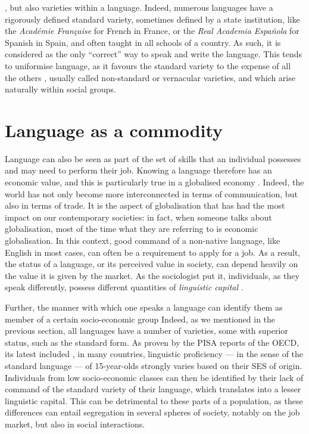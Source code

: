 \documentclass[../thesis.tex]{subfiles}
\begin{document}
\cite{GalMultilingualism2006,RomaineBilingualMultilingual2012,FasoldSociolinguisticsSociety1984},
but also varieties within a language. Indeed, numerous languages have a rigorously
defined standard variety, sometimes defined by a state institution, like the
\textit{Académie Française} for French in France, or the \textit{Real Academia Española}
for Spanish in Spain, and often taught in all schools of a country. As such, it is
considered as the only ``correct'' way to speak and write the language. This tends to
uniformise language, as it favours the standard variety to the expense of all the others
\cite{MilroyIdeologyStandard2006,DavilaInevitabilityStandard2016}, usually called
non-standard or vernacular varieties, and which arise naturally within social groups.


\section{Language as a commodity}
Language can also be seen as part of the set of skills that an individual possesses and
may need to perform their job. Knowing a language therefore has an economic value, and
this is particularly true in a globalised economy
\cite{HellerCommodificationLanguage2010}. Indeed, the world has not only become more
interconnected in terms of communication, but also in terms of trade. It is the aspect
of globalisation that has had the most impact on our contemporary societies: in fact,
when someone talks about globalisation, most of the time what they are referring to is
economic globalisation. In this context, good command of a non-native language, like
English in most cases, can often be a requirement to apply for a job. As a result, the
status of a language, or its perceived value in society, can depend heavily on the value
it is given by the market. As the sociologist
 put it, individuals, as they speak
differently, possess different quantities of \emph{linguistic capital}
\cite{BourdieuLanguageSymbolic2009}.

Further, the manner with which one speaks a language can identify them as member of a
certain socio-economic group Indeed, as we mentioned in the previous section, all
languages have a number of varieties, some with superior status, such as the standard
form. As proven by the PISA reports of the OECD, its latest included
\cite{OECDWhereAll2019}, in many countries, linguistic proficiency --- in the sense of
the standard language --- of 15-year-olds strongly varies based on their \ac{SES} of
origin. Individuals from low socio-economic classes can then be identified by their lack
of command of the standard variety of their language, which translates into a lesser
linguistic capital. This can be detrimental to these parts of a population, as these
differences can entail segregation in several spheres of society, notably on the job
market, but also in social interactions. 
\end{document}
